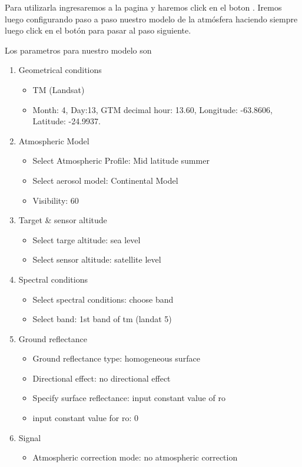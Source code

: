 Para utilizarla ingresaremos a la pagina y haremos click en el boton
. Iremos luego configurando paso a paso nuestro modelo de la
atm\'osfera haciendo siempre luego click en el bot\'on  para
pasar al paso siguiente.

Los parametros para nuestro modelo son

\begin{enumerate}
    \item Geometrical conditions
        \begin{itemize}
            \item TM (Landsat)
            \item Month: 4, Day:13, GTM decimal hour: 13.60, Longitude:
                -63.8606, Latitude: -24.9937.
        \end{itemize}
    \item Atmospheric Model
        \begin{itemize}
            \item Select Atmospheric Profile: Mid latitude summer
            \item Select aerosol model: Continental Model
            \item Visibility: 60
        \end{itemize}
    \item Target \& sensor altitude
        \begin{itemize}
            \item Select targe altitude: sea level
            \item Select sensor altitude: satellite level
        \end{itemize}
    \item Spectral conditions
        \begin{itemize}
            \item Select spectral conditions: choose band
            \item Select band: 1st band of tm (landat 5)
        \end{itemize}
    \item Ground reflectance
        \begin{itemize}
            \item Ground reflectance type: homogeneous surface
            \item Directional effect: no directional effect
            \item Specify surface reflectance: input constant value of ro
            \item input constant value for ro: 0
        \end{itemize}
    \item Signal
        \begin{itemize}
            \item Atmospheric correction mode: no atmospheric correction
        \end{itemize}
\end{enumerate}

